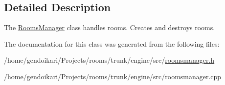 \subsection{Detailed Description}
The \hyperlink{classRoomsManager}{RoomsManager} class handles rooms. Creates and destroys rooms. 

The documentation for this class was generated from the following files:\begin{DoxyCompactItemize}
\item 
/home/gendoikari/Projects/rooms/trunk/engine/src/\hyperlink{roomsmanager_8h}{roomsmanager.h}\item 
/home/gendoikari/Projects/rooms/trunk/engine/src/roomsmanager.cpp\end{DoxyCompactItemize}
